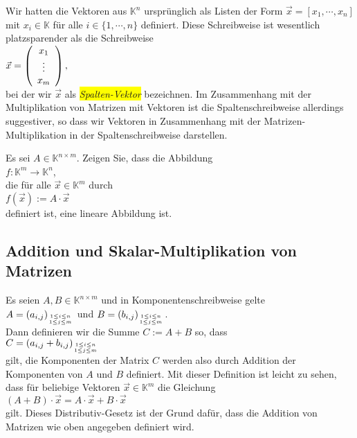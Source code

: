 \remark
Wir hatten die Vektoren aus $\mathbb{K}^n$ urspr\"{u}nglich als Listen der Form $\vec{x} = [x_1, \cdots, x_n]$ mit
$x_i \in \mathbb{K}$ f\"{u}r alle $i\in\{1,\cdots,n\}$ definiert.  Diese Schreibweise ist wesentlich
platzsparender als die Schreibweise
\\[0.2cm]
\hspace*{1.3cm}
$\vec{x} = \left(
      \begin{array}[c]{c}
      x_{1}  \\
      \vdots \\
      x_{m}  \\
      \end{array}
      \right),
$
\\[0.2cm]
bei der wir $\vec{x}$ als \colorbox{yellow}{\emph{Spalten-Vektor}} bezeichnen.  Im Zusammenhang mit der
Multiplikation von Matrizen mit Vektoren ist die Spaltenschreibweise allerdings 
suggestiver, so dass wir Vektoren in Zusammenhang mit der Matrizen-Multiplikation in der
Spaltenschreibweise darstellen.
\eoxs 
\pagebreak

\exercise
Es sei $A \in \mathbb{K}^{n \times m}$.  Zeigen Sie, dass die Abbildung
\\[0.2cm]
\hspace*{1.3cm}
$f: \mathbb{K} ^m \rightarrow \mathbb{K}^n$,
\\[0.2cm]
die f\"{u}r alle $\vec{x} \in \mathbb{K}^m$ durch
\\[0.2cm]
\hspace*{1.3cm}
$f(\vec{x}) := A \cdot \vec{x}$
\\[0.2cm]
definiert ist, eine lineare Abbildung ist.
\exend


\subsection{Addition und Skalar-Multiplikation von Matrizen}
Es seien $A,B \in \mathbb{K}^{n \times m}$ und in Komponentenschreibweise gelte 
\\[0.2cm]
\hspace*{1.3cm}
$A = (a_{i,j})_{1\leq i \leq n \atop 1 \leq j \leq m}$ \quad und \quad
$B = (b_{i,j})_{1\leq i \leq n \atop 1 \leq j \leq m}$.  
\\[0.2cm]
Dann definieren wir die Summe $C := A + B$ so, dass
\\[0.2cm]
\hspace*{1.3cm}
 $C = (a_{i,j} + b_{i,j})_{1\leq i \leq n \atop 1 \leq j \leq m}$ 
\\[0.2cm]
gilt, die Komponenten der
Matrix $C$ werden also durch Addition der Komponenten von $A$ und $B$  definiert.  Mit dieser
Definition ist leicht zu sehen, dass f\"{u}r beliebige Vektoren $\vec{x} \in \mathbb{K}^m$ die Gleichung
\\[0.2cm]
\hspace*{1.3cm}
$(A + B) \cdot \vec{x} = A \cdot \vec{x} + B \cdot \vec{x}$
\\[0.2cm]
gilt.  Dieses Distributiv-Gesetz ist der Grund daf\"{u}r, dass die Addition von Matrizen wie oben
angegeben definiert wird.


